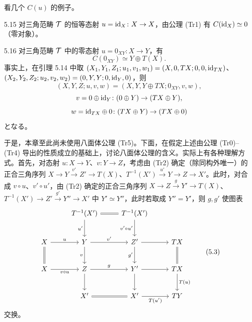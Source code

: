 
看几个 $C(u)$ 的例子。

\begin{example}{5.15}
对三角范畴 $\mathcal{T}$ 的恒等态射 $u=\mathrm{id}_X\colon X\to X$，由公理 (Tr1) 有 $C(\mathrm{id}_X)\simeq 0$（零对象）。
\end{example}

\begin{example}{5.16}
对三角范畴 $\mathcal{T}$ 中的零态射 $u=0_{XY}\colon X\to Y$，有
\[
C(0_{XY}) \simeq Y\oplus T(X).
\]
事实上，在引理 5.14 中取 $(X_1,Y_1,Z_1;u_1,v_1,w_1)=(X,0,TX;0,0,\mathrm{id}_{TX})$、$(X_2,Y_2,Z_2;u_2,v_2,w_2)=(0,Y,Y;0,\mathrm{id}_Y,0)$，则
\[
(X,Y,Z;u,v,w)=(X,Y,Y\oplus TX;0_{XY},v,w),
\]
\[
v=0\oplus\mathrm{id}_Y\colon (0\oplus Y)\to(TX\oplus Y),
\]
\[
w=\mathrm{id}_{TX}\oplus 0\colon (TX\oplus Y)\to(TX\oplus 0)
\]
となる。
\end{example}

于是，本章至此尚未使用八面体公理 (Tr5)。下面，在假定上述由公理 (Tr0)–(Tr4) 导出的性质成立的基础上，讨论八面体公理的含义。实际上有各种理解方式。首先，对态射 $u\colon X\to Y$、$v\colon Y\to Z$，考虑由 (Tr2) 确定（除同构外唯一）的正合三角序列 $X\to Y\xrightarrow{v'}Z'\to T(X)$、$T^{-1}(X')\xrightarrow{u'}Y\to Z\to X'$。此时，对合成 $v\circ u$、$v'\circ u'$，由 (Tr2) 确定的正合三角序列 $X\to Z\xrightarrow{g}Y'\to T(X)$、$T^{-1}(X')\to Z'\xrightarrow{g'}Y''\to X'$ 中 $Y'\simeq Y''$，此时若取成 $Y''=Y'$，则 $g,g'$ 使图表
\begin{equation}
\begin{tikzcd}[row sep=2.4em, column sep=2.6em]
{} & T^{-1}(X') \arrow[r,equal] \arrow[d,"u'"'] & T^{-1}(X') \arrow[d,"v'\circ u'"'] & {} \\
X \arrow[r,"u"] \arrow[d,equal] & Y \arrow[r,"v'"] \arrow[d,"v"'] & Z' \arrow[r] \arrow[d,"g'"'] & TX \arrow[d,equal] \\
X \arrow[r,"v\circ u"'] & Z \arrow[r,"g"] \arrow[d] & Y' \arrow[r] \arrow[d] & TX \arrow[d,"T(u)"] \\
{} & X' \arrow[r,equal] & X' \arrow[r,"T(u')"'] & TY
\end{tikzcd} \tag{5.3}
\end{equation}
交换。

